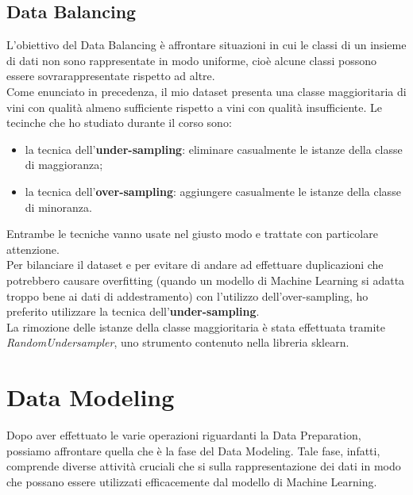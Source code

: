 \documentclass{article}
\begin{document}
\begin{titlepage}
        \subsection{Data Balancing}
        L'obiettivo del Data Balancing è affrontare situazioni in cui le classi di un insieme di dati non sono rappresentate in modo uniforme, cioè alcune classi possono essere sovrarappresentate rispetto ad altre.\\
        Come enunciato in precedenza, il mio dataset presenta una classe maggioritaria di vini con qualità almeno sufficiente rispetto a vini con qualità insufficiente. Le tecinche che ho studiato durante il corso sono:
        \begin{itemize}
            \item la tecnica dell'\textbf{under-sampling}: eliminare casualmente le istanze della classe di maggioranza;
            \item la tecnica dell'\textbf{over-sampling}: aggiungere casualmente le istanze della classe di minoranza.
        \end{itemize}
        Entrambe le tecniche vanno usate nel giusto modo e trattate con particolare attenzione.\\ Per bilanciare il dataset e per evitare di andare ad effettuare duplicazioni che potrebbero causare overfitting (quando un modello di Machine Learning si adatta troppo bene ai dati di addestramento) con l'utilizzo dell'over-sampling, ho preferito utilizzare la tecnica dell'\textbf{under-sampling}. \\ La rimozione delle istanze della classe maggioritaria è stata effettuata tramite \textit{RandomUndersampler}, uno strumento contenuto nella libreria sklearn.
        \section{Data Modeling}
        Dopo aver effettuato le varie operazioni riguardanti la Data Preparation, possiamo affrontare quella che è la fase del Data Modeling. Tale fase, infatti, comprende diverse attività cruciali che si sulla rappresentazione dei dati in modo che possano essere utilizzati efficacemente dal modello di Machine Learning.


\end{titlepage}
\end{document}
